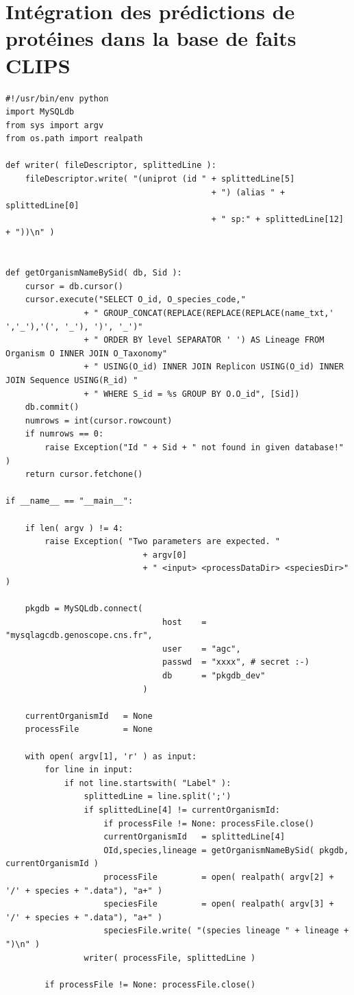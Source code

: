 \section{Intégration des prédictions de protéines dans la base de faits CLIPS}
\begin{lstlisting}[style=python-style,caption=getProteinFacts.py]
#!/usr/bin/env python
import MySQLdb
from sys import argv
from os.path import realpath

def writer( fileDescriptor, splittedLine ):
    fileDescriptor.write( "(uniprot (id " + splittedLine[5]
                                          + ") (alias " + splittedLine[0]
                                          + " sp:" + splittedLine[12]  + "))\n" )


def getOrganismNameBySid( db, Sid ):
    cursor = db.cursor()
    cursor.execute("SELECT O_id, O_species_code,"
                + " GROUP_CONCAT(REPLACE(REPLACE(REPLACE(name_txt,' ','_'),'(', '_'), ')', '_')"
                + " ORDER BY level SEPARATOR ' ') AS Lineage FROM Organism O INNER JOIN O_Taxonomy"
                + " USING(O_id) INNER JOIN Replicon USING(O_id) INNER JOIN Sequence USING(R_id) "
                + " WHERE S_id = %s GROUP BY O.O_id", [Sid])
    db.commit()
    numrows = int(cursor.rowcount)
    if numrows == 0:
        raise Exception("Id " + Sid + " not found in given database!" )
    return cursor.fetchone()

if __name__ == "__main__":

    if len( argv ) != 4:
        raise Exception( "Two parameters are expected. "
        					+ argv[0]
        					+ " <input> <processDataDir> <speciesDir>" )

    pkgdb = MySQLdb.connect(
                                host    = "mysqlagcdb.genoscope.cns.fr",
                                user    = "agc", 
                                passwd  = "xxxx", # secret :-)
                                db      = "pkgdb_dev"
                            )

    currentOrganismId   = None
    processFile         = None

    with open( argv[1], 'r' ) as input:
        for line in input:
            if not line.startswith( "Label" ):
                splittedLine = line.split(';')
                if splittedLine[4] != currentOrganismId:
                    if processFile != None: processFile.close() 
                    currentOrganismId   = splittedLine[4]
                    OId,species,lineage = getOrganismNameBySid( pkgdb, currentOrganismId )
                    processFile         = open( realpath( argv[2] + '/' + species + ".data"), "a+" )
                    speciesFile         = open( realpath( argv[3] + '/' + species + ".data"), "a+" )
                    speciesFile.write( "(species lineage " + lineage + ")\n" )
                writer( processFile, splittedLine ) 

        if processFile != None: processFile.close()
\end{lstlisting}

